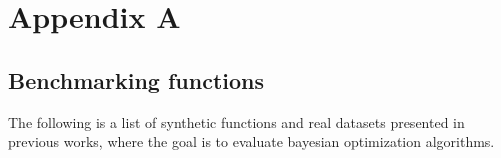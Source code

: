 \ifpdf
    \graphicspath{{Appendix1/Figs/Raster/}{Appendix1/Figs/PDF/}{Appendix1/Figs/}}
\else
    \graphicspath{{Appendix1/Figs/Vector/}{Appendix1/Figs/}}
\fi

\chapter{Appendix A}

\section{Benchmarking functions}

The following is a list of synthetic functions and real datasets presented in previous works, where the goal is to evaluate bayesian optimization algorithms. 

